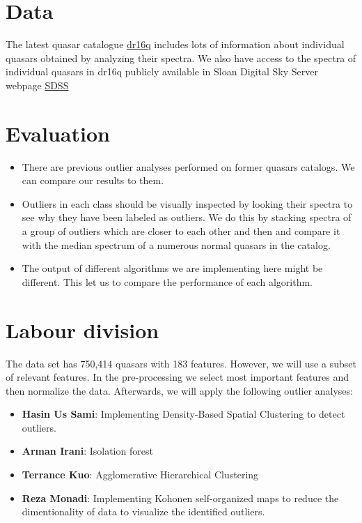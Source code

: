 \documentclass[usenatbib,a4paper,fleqn]{article}
\begin{document}
\section*{Data }
The latest quasar catalogue \href{https://www.sdss.org/dr16/algorithms/qso_catalog}{dr16q} includes lots of information 
about individual quasars obtained by analyzing their spectra. 
We also have access to the spectra of individual quasars in dr16q publicly available in Sloan Digital Sky Server webpage 
\href{https://www.sdss.org/dr16/spectro}{SDSS}

\section*{Evaluation }
\begin{itemize}
   \item  There are previous outlier analyses performed on former quasars catalogs. We can compare our results to them. 
   \item  Outliers in each class should be visually inspected by looking their spectra to see why they have been labeled as outliers. We do this by
   stacking spectra of a group of outliers which are closer to each other and then and compare 
   it with the median spectrum of a numerous normal quasars in the catalog. 
   \item The output of different algorithms we are implementing here might be different. This let us to compare the performance of each algorithm. 
\end{itemize}  


\section*{ Labour division}

The data set has 750,414 quasars with 183 features. However, we will use a subset of relevant features.
In the pre-processing we select most important features and then normalize the data. Afterwards, we will apply the following outlier analyses:
\begin{itemize}
 
\item \textbf{Hasin Us Sami}: Implementing Density-Based Spatial Clustering to detect outliers.
\item \textbf{Arman Irani}: Isolation forest
\item \textbf{Terrance Kuo}: Agglomerative Hierarchical Clustering
\item  \textbf{Reza Monadi}: Implementing Kohonen self-organized maps to reduce the dimentionality of data to visualize the 
identified outliers.

\end{itemize}
\end{document}
